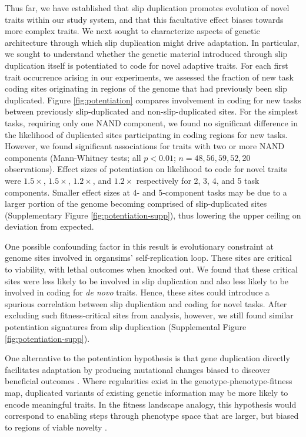 Thus far, we have established that slip duplication promotes evolution of novel traits within our study system, and that this facultative effect biases towards more complex traits.
We next sought to characterize aspects of genetic architecture through which slip duplication might drive adaptation.
In particular, we sought to understand whether the genetic material introduced through slip duplication itself is potentiated to code for novel adaptive traits.
For each first trait occurrence arising in our experiments, we assessed the fraction of new task coding sites originating in regions of the genome that had previously been slip duplicated.
Figure \ref{fig:potentiation} compares involvement in coding for new tasks between previously slip-duplicated and non-slip-duplicated sites.
For the simplest tasks, requiring only one NAND component, we found no significant difference in the likelihood of duplicated sites participating in coding regions for new tasks.
However, we found significant associations for traits with two or more NAND components (Mann-Whitney tests; all $p < 0.01$; $n=48,56,59,52,20$ observations).
Effect sizes of potentiation on likelihood to code for novel traits were $1.5\times$, $1.5\times$, $1.2\times$, and $1.2\times$ respectively for 2, 3, 4, and 5 task components.
Smaller effect sizes at 4- and 5-component tasks may be due to a larger portion of the genome becoming comprised of slip-duplicated sites (Supplementary Figure \ref{fig:potentiation-supp}), thus lowering the upper ceiling on deviation from expected.

One possible confounding factor in this result is evolutionary constraint at genome sites involved in organsims' self-replication loop.
These sites are critical to viability, with lethal outcomes when knocked out.
We found that these critical sites were less likely to be involved in slip duplication and also less likely to be involved in coding for \textit{de novo} traits.
Hence, these sites could introduce a spurious correlation between slip duplication and coding for novel tasks.
After excluding such fitness-critical sites from analysis,
however, we still found similar potentiation signatures from slip duplication (Supplemental Figure \ref{fig:potentiation-supp}).

One alternative to the potentiation hypothesis is that gene duplication directly facilitates adaptation by producing mutational changes biased to discover beneficial outcomes \citep{kondrashov2012gene}.
Where regularities exist in the genotype-phenotype-fitness map, duplicated variants of existing genetic information may be more likely to encode meaningful traits.
In the fitness landscape analogy, this hypothesis would correspond to enabling steps through phenotype space that are larger, but biased to regions of viable novelty \citep{tarapore2015evolvability}.

